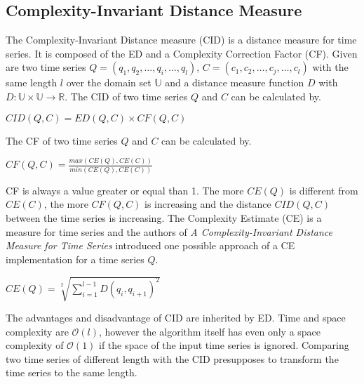\subsection{Complexity-Invariant Distance Measure} \label{complexity-invariant_distance_measure}
The Complexity-Invariant Distance measure \cite{batista2011complexity} (CID) is a distance measure for time
series. It is composed of the ED and a Complexity Correction Factor (CF). Given are two time series
$Q = (q_1, q_2, \dots, q_i, \dots, q_l)$, $C = (c_1, c_2, \dots, c_j, \dots, c_l)$ with the same length $l$ over the
domain set $\mathbb{U}$ and a distance measure function $D$ with $D: \mathbb{U} \times \mathbb{U} \to \mathbb{R}$.
The CID of two time series $Q$ and $C$ can be calculated by.
\begin{center}
    $CID(Q, C) = ED(Q, C) \times CF(Q, C)$
\end{center}
The CF of two time series $Q$ and $C$ can be calculated by.
\begin{center}
     $CF(Q, C) = \frac{max(CE(Q), CE(C))}{min(CE(Q), CE(C))}$
\end{center}
CF is always a value greater or equal than 1. The more $CE(Q)$ is different from $CE(C)$, the more $CF(Q, C)$ is
increasing and the distance $CID(Q, C)$ between the time series is increasing. The Complexity Estimate (CE) is a measure
for time series and the authors of \textit{A Complexity-Invariant Distance Measure for Time Series}
\cite{batista2011complexity} introduced one possible approach of a CE implementation for a time series $Q$.
\begin{center}
    $CE(Q) = \sqrt[2]{\sum \limits_{i=1}^{l-1} D(q_i, q_{i + 1})^2}$
\end{center}

The advantages and disadvantage of CID are inherited by ED. Time and space complexity are $\mathcal{O}(l)$, however the
algorithm itself has even only a space complexity of $\mathcal{O}(1)$ if the space of the input time series is ignored.
Comparing two time series of different length with the CID presupposes to transform the time series to the same length.


